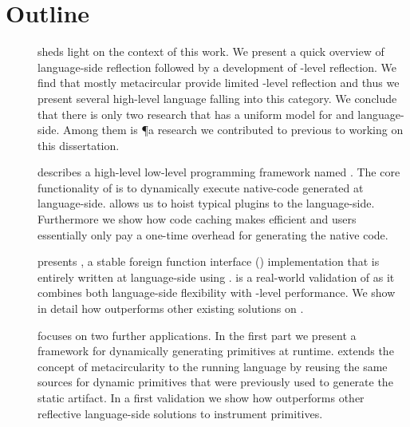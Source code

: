 \section{Outline}

\begin{description}
\item[] sheds light on the context of this work.
	We present a quick overview of language-side reflection followed by a development of \VM-level reflection.
	We find that mostly metacircular \VMs provide limited \VM-level reflection and thus we present several high-level language \VMs falling into this category.
	We conclude that there is only two research \VM that has a uniform model for \VM and language-side.
	Among them is \P a research \ST \VM we contributed to previous to working on this dissertation.


\item[] describes a high-level low-level programming framework named \B.
	The core functionality of \B is to dynamically execute native-code generated at language-side.
	\B allows us to hoist typical \VM plugins to the language-side.
	Furthermore we show how code caching makes \B efficient and users essentially only pay a one-time overhead for generating the native code.
	
\item[] presents \NB, a stable foreign function interface (\FFI) implementation that is entirely written at language-side using \B.
	\NB is a real-world validation of \B as it combines both language-side flexibility with \VM-level performance.
	We show in detail how \NB outperforms other existing \FFI solutions on \PH.

\item[] focuses on two further \B applications.
	In the first part we present \WF a framework for dynamically generating primitives at runtime.
	\WF extends the concept of metacircularity to the running language by reusing the same sources for dynamic primitives that were previously used to generate the static \VM artifact.
	In a first validation we show how \WF outperforms other reflective language-side solutions to instrument primitives.
	

\end{description}

